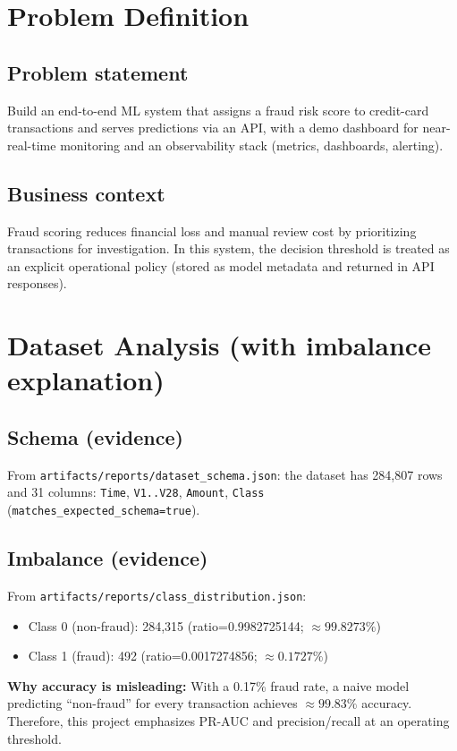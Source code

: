 \documentclass[11pt]{article}
\newcommand{\code}[1]{\texttt{#1}}
\begin{document}
\section{Problem Definition}
\subsection{Problem statement}
Build an end-to-end ML system that assigns a fraud risk score to credit-card transactions and serves predictions via an API, with a demo dashboard for near-real-time monitoring and an observability stack (metrics, dashboards, alerting).

\subsection{Business context}
Fraud scoring reduces financial loss and manual review cost by prioritizing transactions for investigation. In this system, the decision threshold is treated as an explicit operational policy (stored as model metadata and returned in API responses).

\section{Dataset Analysis (with imbalance explanation)}
\subsection{Schema (evidence)}
From \code{artifacts/reports/dataset_schema.json}: the dataset has 284,807 rows and 31 columns: \code{Time}, \code{V1..V28}, \code{Amount}, \code{Class} (\code{matches_expected_schema=true}).

\subsection{Imbalance (evidence)}
From \code{artifacts/reports/class_distribution.json}:
\begin{itemize}
  \item Class 0 (non-fraud): 284,315 (ratio=0.9982725144; \(\approx 99.8273\%\))
  \item Class 1 (fraud): 492 (ratio=0.0017274856; \(\approx 0.1727\%\))
\end{itemize}
\textbf{Why accuracy is misleading:} With a 0.17\% fraud rate, a naive model predicting ``non-fraud'' for every transaction achieves \(\approx 99.83\%\) accuracy. Therefore, this project emphasizes PR-AUC and precision/recall at an operating threshold.
\end{document}
